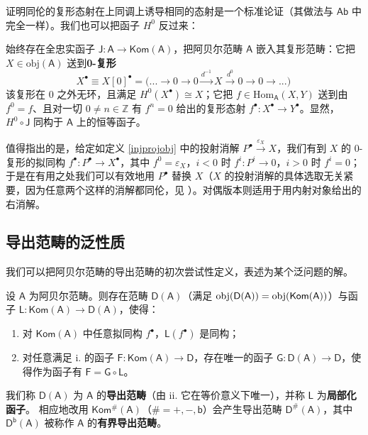 证明同伦的复形态射在上同调上诱导相同的态射是一个标准论证（其做法与 $\mathsf{Ab}$ 中完全一样）。我们也可以把函子 $H^0$ 反过来：

\begin{Rem}\label{0-complex}
	始终存在全忠实函子 $\mathsf{J}:\mathsf{A}\rightarrow\mathsf{Kom(A)}$，把阿贝尔范畴 $\mathsf{A}$ 嵌入其复形范畴：它把 $X\in\text{obj}(\mathsf{A})$ 送到\textbf{0-复形}
	\[
	X^\bullet\equiv X[0]^\bullet=\big(...\rightarrow 0\rightarrow 0\xrightarrow{d^{-1}} X\xrightarrow{d^0} 0\rightarrow 0\rightarrow...\big)\,
	\]
	该复形在 0 之外无环，且满足 $H^0(X^\bullet)\cong X$；它把 $f\in\text{Hom}_\mathsf{A}(X,Y)$ 送到由 $f^0=f$、且对一切 $0\neq n\in\mathbb{Z}$ 有 $f^n=0$ 给出的复形态射 $f^\bullet:X^\bullet\rightarrow Y^\bullet$。显然，$H^0\circ\mathsf{J}$ 同构于 $\mathsf{A}$ 上的恒等函子。
	
	值得指出的是，给定如定义 \ref{injprojobj} 中的投射消解 $P^\bullet\xrightarrow{\varepsilon_X} X$，我们有到 $X$ 的 0-复形的拟同构 $f^\bullet:P^\bullet\rightarrow X^\bullet$，其中 $f^0=\varepsilon_X$，$i<0$ 时 $f^i:P^i\rightarrow 0$，$i>0$ 时 $f^i=0$；于是在有用之处我们可以有效地用 $P^\bullet$ 替换 $X$（$X$ 的投射消解的具体选取无关紧要，因为任意两个这样的消解都同伦，见 \cite[Theorem III.1.3]{[GM03]}）。对偶版本则适用于用内射对象给出的右消解。  
\end{Rem}



\subsection{导出范畴的泛性质}\label{ch2.2}


我们可以把阿贝尔范畴的导出范畴的初次尝试性定义，表述为某个泛问题的解。

\begin{Pro}\label{derivedexists}
	设 $\mathsf{A}$ 为阿贝尔范畴。则存在范畴 $\mathsf{D(A)}$（满足 $\textup{obj}(\mathsf{D(A)})=\textup{obj}(\mathsf{Kom(A)})$）与函子 $\mathsf{L}:\mathsf{Kom(A)}\rightarrow\mathsf{D(A)}$，使得：
	\renewcommand{\theenumi}{\roman{enumi}}
	\begin{enumerate}[leftmargin=0.6cm] 
		\item 对 $\mathsf{Kom(A)}$ 中任意拟同构 $f^\bullet$，$\mathsf{L}(f^\bullet)$ 是同构；
		
		\item 对任意满足 i. 的函子 $\mathsf{F}:\mathsf{Kom(A)}\rightarrow\mathsf{D}$，存在唯一的函子 $\mathsf{G}:\mathsf{D(A)}\rightarrow\mathsf{D}$，使得作为函子有 $\mathsf{F}=\mathsf{G}\circ\mathsf{L}$。
	\end{enumerate}
	\!我们称 $\mathsf{D(A)}$ 为 $\mathsf{A}$ 的\textbf{导出范畴}（由 ii. 它在等价意义下唯一），并称 $\mathsf{L}$ 为\textbf{局部化函子}。
	相应地改用 $\mathsf{Kom^\#\!(A)}$（$\#=+,-,\mathsf{b}$）会产生导出范畴 $\mathsf{D^\#\!(A)}$，其中 $\mathsf{D^b(A)}$ 被称作 $\mathsf{A}$ 的\textbf{有界导出范畴}。
\end{Pro}

